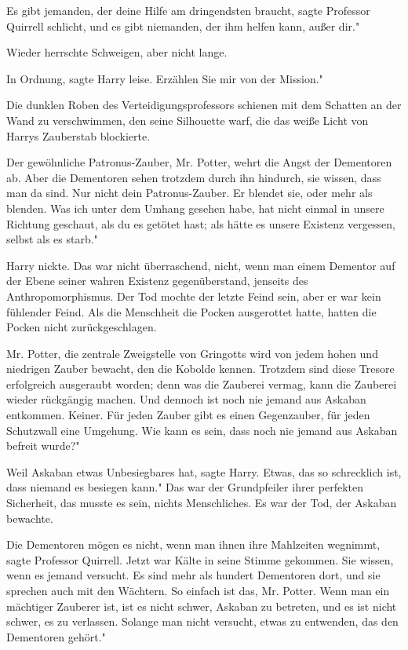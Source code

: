 \glqq{}Es gibt jemanden, der deine Hilfe am dringendsten braucht\grqq{}, sagte
Professor Quirrell schlicht, \glqq{}und es gibt niemanden, der ihm helfen kann,
außer dir."

Wieder herrschte Schweigen, aber nicht lange.

\glqq{}In Ordnung\grqq{}, sagte Harry leise. \glqq{}Erzählen Sie mir von der
Mission."

Die dunklen Roben des Verteidigungsprofessors schienen mit dem Schatten an der
Wand zu verschwimmen, den seine Silhouette warf, die das weiße Licht von Harrys
Zauberstab blockierte.

\glqq{}Der gewöhnliche Patronus-Zauber, Mr. Potter, wehrt die Angst der
Dementoren ab. Aber die Dementoren sehen trotzdem durch ihn hindurch, sie
wissen, dass man da sind. Nur nicht dein Patronus-Zauber. Er blendet sie, oder
mehr als blenden. Was ich unter dem Umhang gesehen habe, hat nicht einmal in
unsere Richtung geschaut, als du es getötet hast; als hätte es unsere Existenz
vergessen, selbst als es starb."

Harry nickte. Das war nicht überraschend, nicht, wenn man einem Dementor auf der
Ebene seiner wahren Existenz gegenüberstand, jenseits des Anthropomorphismus.
Der Tod mochte der letzte Feind sein, aber er war kein fühlender Feind. Als die
Menschheit die Pocken ausgerottet hatte, hatten die Pocken nicht
zurückgeschlagen.

\glqq{}Mr. Potter, die zentrale Zweigstelle von Gringotts wird von jedem hohen
und niedrigen Zauber bewacht, den die Kobolde kennen. Trotzdem sind diese
Tresore erfolgreich ausgeraubt worden; denn was die Zauberei vermag, kann die
Zauberei wieder rückgängig machen. Und dennoch ist noch nie jemand aus Askaban
entkommen. Keiner. Für jeden Zauber gibt es einen Gegenzauber, für jeden
Schutzwall eine Umgehung. Wie kann es sein, dass noch nie jemand aus Askaban
befreit wurde?"

\glqq{}Weil Askaban etwas Unbesiegbares hat\grqq{}, sagte Harry. \glqq{}Etwas, das
so schrecklich ist, dass niemand es besiegen kann." Das war der Grundpfeiler
ihrer perfekten Sicherheit, das musste es sein, nichts Menschliches. Es war der
Tod, der Askaban bewachte.

\glqq{}Die Dementoren mögen es nicht, wenn man ihnen ihre Mahlzeiten
wegnimmt\grqq{}, sagte Professor Quirrell. Jetzt war Kälte in seine Stimme
gekommen. \glqq{}Sie wissen, wenn es jemand versucht. Es sind mehr als hundert
Dementoren dort, und sie sprechen auch mit den Wächtern. So einfach ist das, Mr.
Potter. Wenn man ein mächtiger Zauberer ist, ist es nicht schwer, Askaban zu
betreten, und es ist nicht schwer, es zu verlassen. Solange man nicht versucht,
etwas zu entwenden, das den Dementoren gehört."

